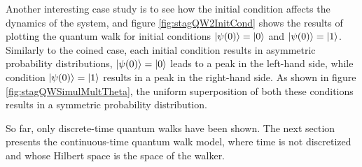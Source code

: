 \documentclass[../../dissertation.tex]{subfiles}
\begin{document}
Another interesting case study is to see how the initial condition affects the
dynamics of the system, and figure \ref{fig:stagQW2InitCond} shows the results
of plotting the quantum walk for initial conditions  $\ket{\psi(0)}=\ket{0}$
and $\ket{\psi(0)}=\ket{1}$.  Similarly to the coined case, each initial
condition results in asymmetric probability distributions,
$\ket{\psi(0)}=\ket{0}$ leads to a peak  in the left-hand side, while condition
$\ket{\psi(0)}=\ket{1}$ results in a peak in the right-hand side. As shown
in figure \ref{fig:stagQWSimulMultTheta}, the uniform superposition of both
these conditions results in a symmetric probability distribution.\par

So far, only discrete-time quantum walks have been shown. The next section
presents the continuous-time quantum walk model, where time is not discretized
and whose Hilbert space is the space of the walker.

\end{document}
